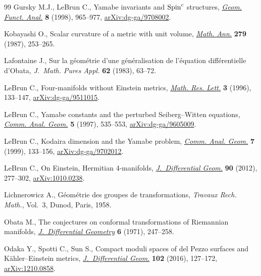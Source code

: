 \documentclass[pdftex]{sigma}
\numberwithin{equation}{section}
\begin{document}
\begin{thebibliography}{99}
Gursky M.J., LeBrun C., Yamabe invariants and {${\rm Spin}^c$} structures,
 \href{https://doi.org/10.1007/s000390050120}{\textit{Geom. Funct. Anal.}} \textbf{8} (1998), 965--977,
 \href{https://arxiv.org/abs/dg-ga/9708002}{arXiv:dg-ga/9708002}.

Kobayashi O., Scalar curvature of a metric with unit volume, \href{https://doi.org/10.1007/BF01461722}{\textit{Math.
 Ann.}} \textbf{279} (1987), 253--265.

Lafontaine J., Sur la g\'eom\'etrie d'une g\'en\'eralisation de l'\'equation
 diff\'erentielle d'{O}bata, \textit{J.~Math. Pures Appl.} \textbf{62} (1983),
 63--72.

LeBrun C., Four-manifolds without {E}instein metrics, \href{https://doi.org/10.4310/MRL.1996.v3.n2.a1}{\textit{Math. Res. Lett.}}
 \textbf{3} (1996), 133--147, \href{https://arxiv.org/abs/dg-ga/9511015}{arXiv:dg-ga/9511015}.

LeBrun C., Yamabe constants and the perturbed {S}eiberg--{W}itten equations,
 \href{https://doi.org/10.4310/CAG.1997.v5.n3.a6}{\textit{Comm. Anal. Geom.}} \textbf{5} (1997), 535--553,
 \href{https://arxiv.org/abs/dg-ga/9605009}{arXiv:dg-ga/9605009}.

LeBrun C., Kodaira dimension and the {Y}amabe problem, \href{https://doi.org/10.4310/CAG.1999.v7.n1.a5}{\textit{Comm. Anal.
 Geom.}} \textbf{7} (1999), 133--156, \href{https://arxiv.org/abs/dg-ga/9702012}{arXiv:dg-ga/9702012}.

LeBrun C., On {E}instein, {H}ermitian 4-manifolds, \href{https://doi.org/10.4310/jdg/1335230848}{\textit{J.~Differential
 Geom.}} \textbf{90} (2012), 277--302, \href{https://arxiv.org/abs/1010.0238}{arXiv:1010.0238}.

Lichnerowicz A., G\'eom\'etrie des groupes de transformations, \textit{Travaux
 Rech. Math.}, Vol.~3, Dunod, Paris, 1958.

Obata M., The conjectures on conformal transformations of {R}iemannian
 manifolds, \href{https://doi.org/10.4310/jdg/1214430407}{\textit{J.~Differential Geometry}} \textbf{6} (1971), 247--258.

Odaka Y., Spotti C., Sun S., Compact moduli spaces of del {P}ezzo surfaces and
 {K}\"ahler--{E}instein metrics, \href{https://doi.org/10.4310/jdg/1452002879}{\textit{J.~Differential Geom.}} \textbf{102}
 (2016), 127--172, \href{https://arxiv.org/abs/1210.0858}{arXiv:1210.0858}.


\end{thebibliography}
\end{document}

